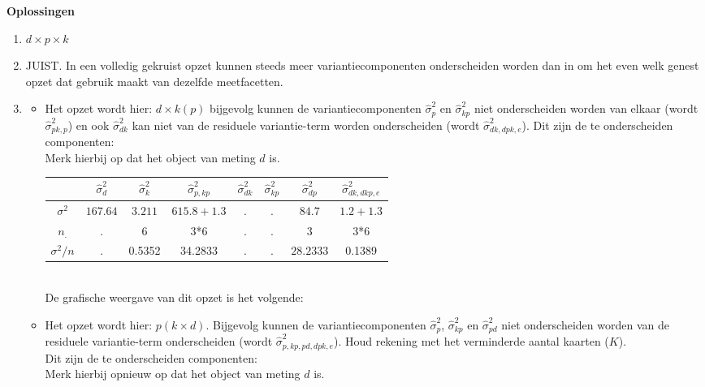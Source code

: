 \OPLOSSING
{
\textbf{Oplossingen}
\begin{enumerate}
\item $d \times p \times k$

\item JUIST. In een volledig gekruist opzet kunnen steeds meer variantiecomponenten onderscheiden worden dan in om het even welk genest opzet dat gebruik maakt van dezelfde meetfacetten. 
\item
\begin{itemize}
	\item Het opzet wordt hier: $d \times k\left(p\right)$ bijgevolg kunnen de variantiecomponenten $\hat{\sigma}^2_p$ en $\hat{\sigma}^2_{kp}$ niet onderscheiden worden van elkaar (wordt $\hat{\sigma}^2_{pk,p}$) en ook $\hat{\sigma}^2_{dk}$ kan niet van de residuele variantie-term worden onderscheiden (wordt $\hat{\sigma}^2_{dk, dpk,e}$). Dit zijn de te onderscheiden componenten:\\ Merk hierbij op dat het object van meting $d$ is. \\
	\begin{tabular}{|c|c|c|c|c|c|c|c|} \hline
	 & $ \hat{\sigma}^2_{d}$ & $ \hat{\sigma}^2_{k} $& $ \hat{\sigma}^2_{p,kp} $ & $ \hat{\sigma}^2_{dk}$ & $\hat{\sigma}^2_{kp} $ & $ \hat{\sigma}^2_{dp} $& $ \hat{\sigma}^2_{dk, dkp, e} $ \\ \hline
	$\sigma^2$  			& $ 167.64 $ 			& $ 3.211 $ 			& $615.8+1.3  $ 			& $ .$				 & $. $	& $ 84.7 $	 & $ 1.2 + 1.3  $ \\
	$n_.$				& .						& 6						& 3*6				 		& $ .$		  		 & $. $	& $ 3 $		 &  3*6 \\ \hline
	$\sigma^2 / n$ 		& .						& 0.5352				& 34.2833				 	& $ .$			  	 & $. $	& $ 28.2333 $& 0.1389 \\ \hline
	\end{tabular} \\
	De grafische weergave van dit opzet is het volgende:\\
	
	
	\item Het opzet wordt hier: $p\left(k\times d\right)$. Bijgevolg kunnen de variantiecomponenten $\hat{\sigma}^2_p$, $\hat{\sigma}^2_{kp}$ en $\hat{\sigma}^2_{pd}$ niet onderscheiden worden van de residuele variantie-term onderscheiden (wordt $\hat{\sigma}^2_{p, kp, pd, dpk, e}$). Houd rekening met het verminderde aantal kaarten ($K$).\\Dit zijn de te onderscheiden componenten:\\ Merk hierbij opnieuw op dat het object van meting $d$ is. \\


\end{itemize}
\end{enumerate}}
